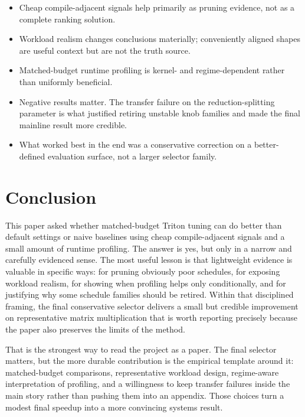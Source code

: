 \documentclass[10pt,twocolumn]{article}
\begin{document}
\begin{itemize}
\item Cheap compile-adjacent signals help primarily as pruning evidence, not as a complete ranking solution.
\item Workload realism changes conclusions materially; conveniently aligned shapes are useful context but are not the truth source.
\item Matched-budget runtime profiling is kernel- and regime-dependent rather than uniformly beneficial.
\item Negative results matter. The transfer failure on the reduction-splitting parameter is what justified retiring unstable knob families and made the final mainline result more credible.
\item What worked best in the end was a conservative correction on a better-defined evaluation surface, not a larger selector family.
\end{itemize}

\section{Conclusion}

This paper asked whether matched-budget Triton tuning can do better than default settings or naive baselines using cheap compile-adjacent signals and a small amount of runtime profiling. The answer is yes, but only in a narrow and carefully evidenced sense. The most useful lesson is that lightweight evidence is valuable in specific ways: for pruning obviously poor schedules, for exposing workload realism, for showing when profiling helps only conditionally, and for justifying why some schedule families should be retired. Within that disciplined framing, the final conservative selector delivers a small but credible improvement on representative matrix multiplication that is worth reporting precisely because the paper also preserves the limits of the method.

That is the strongest way to read the project as a paper. The final selector matters, but the more durable contribution is the empirical template around it: matched-budget comparisons, representative workload design, regime-aware interpretation of profiling, and a willingness to keep transfer failures inside the main story rather than pushing them into an appendix. Those choices turn a modest final speedup into a more convincing systems result.

\clearpage


\end{document}
